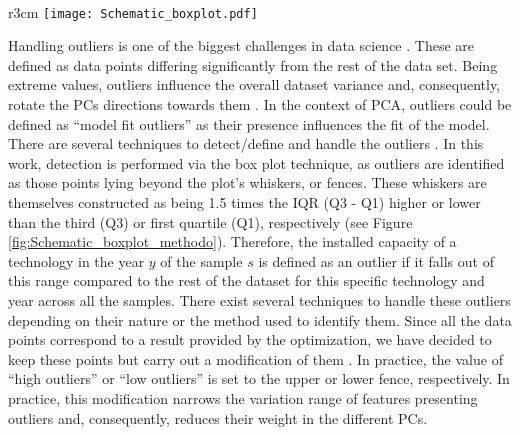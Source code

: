 \\

\begin{wrapfigure}{r}{3cm}
\centering
\captionsetup{justification=centering}
\texttt{[image: Schematic\_boxplot.pdf]}
\caption{}
\label{fig:Schematic_boxplot_methodo}
\end{wrapfigure}

\noindent
Handling outliers is one of the biggest challenges in data science \cite{aguinis2013best}. These are defined as data points differing significantly from the rest of the data set. Being extreme values, outliers influence the overall dataset variance and, consequently, rotate the PCs directions towards them \cite{stanimirova2007dealing}. In the context of \gls{PCA}, outliers could be defined as ``model fit outliers'' as their presence influences the fit of the model. There are several techniques to detect/define and handle the outliers \cite{aguinis2013best}. In this work, detection is performed via the box plot technique, as outliers are identified as those points lying beyond the plot’s whiskers, or fences. These whiskers are themselves constructed as being 1.5 times the \gls{IQR} (Q3 - Q1) higher or lower than the third (Q3) or first quartile (Q1), respectively (see Figure \ref{fig:Schematic_boxplot_methodo}). Therefore, the installed capacity of a technology in the year $y$ of the sample $s$ is defined as an outlier if it falls out of this range compared to the rest of the dataset for this specific technology and year across all the samples. There exist several techniques to handle these outliers depending on their nature or the method used to identify them. Since all the data points correspond to a result provided by the optimization, we have decided to keep these points but carry out a modification of them \cite{aguinis2013best}. In practice,  the value of ``high outliers'' or ``low outliers'' is set to the upper or lower fence, respectively. In practice, this modification narrows the variation range of features presenting outliers and, consequently, reduces their weight in the different PCs.\\

\\

